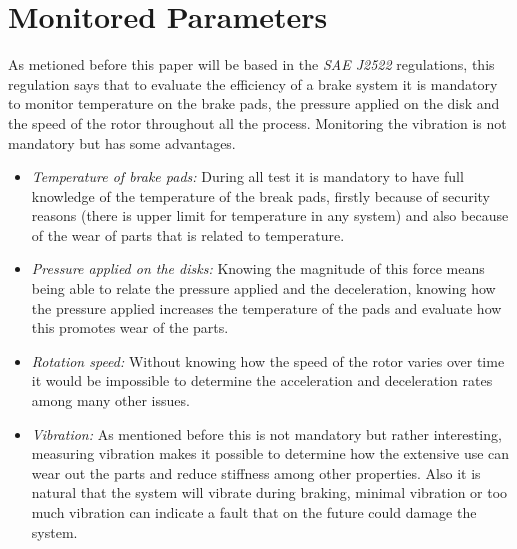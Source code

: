\section{Monitored Parameters}\label{sec:monitored-parameters}
		As metioned before this paper will be based in the \textit{SAE J2522} regulations, this regulation says that to evaluate the efficiency of a brake system it is mandatory to monitor temperature on the brake pads, the pressure applied on the disk and the speed of the rotor throughout all the process. Monitoring the vibration is not mandatory but has some advantages.

	\begin{itemize}
		\item\textit{Temperature of brake pads: } During all test it is mandatory to have full knowledge of the temperature of the break pads, firstly because of security reasons (there is upper limit for temperature in any system) and also because of the wear of parts that is related to temperature.\label{itm:temperature-of-brake-pads}
		\item\textit{Pressure applied on the disks: } Knowing the magnitude of this force means being able to relate the pressure applied and the deceleration, knowing how the pressure applied increases the temperature of the pads and evaluate how this promotes wear of the parts.\label{itm:pressure-applied-on-the-disks}
		\item\textit{Rotation speed: } Without knowing how the speed of the rotor varies over time it would be impossible to determine the acceleration and deceleration rates among many other issues.\label{itm:rotation-speed}
		\item\textit{Vibration: } As mentioned before this is not mandatory but rather interesting, measuring vibration makes it possible to determine how the extensive use can wear out the parts and reduce stiffness among other properties. Also it is natural that the system will vibrate during braking, minimal vibration or too much vibration can indicate a fault that on the future could damage the system.\label{itm:vibration}
	\end{itemize}

